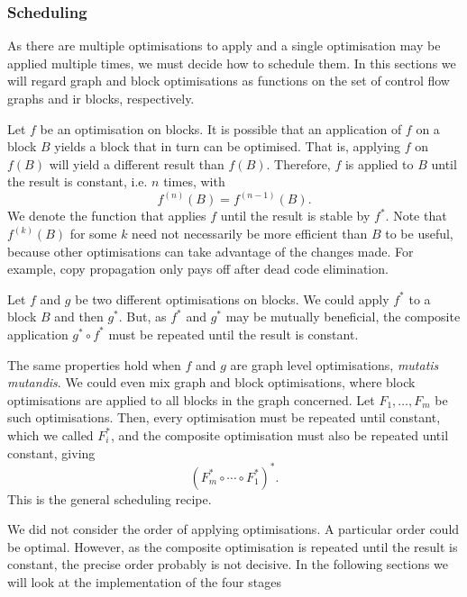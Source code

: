 \subsubsection*{Scheduling}
As there are multiple optimisations to apply and a single optimisation may be applied multiple times, we must decide how to schedule them. In this sections we will regard graph and block optimisations as functions on the set of control flow graphs and ir blocks, respectively.

Let $f$ be an optimisation on blocks. It is possible that an application of $f$ on a block $B$ yields a block that in turn can be optimised. That is, applying $f$ on $f(B)$ will yield a different result than $f(B)$. Therefore, $f$ is applied to $B$ until the result is constant, i.e. $n$ times, with $$f^{(n)}(B) = f^{(n-1)}(B).$$ We denote the function that applies $f$ until the result is stable by $f^*$. Note that $f^{(k)}(B)$ for some $k$ need not necessarily be more efficient than $B$ to be useful, because other optimisations can take advantage of the changes made. For example, copy propagation only pays off after dead code elimination.

Let $f$ and $g$ be two different optimisations on blocks. We could apply $f^*$ to a block $B$ and then $g^*$. But, as $f^*$ and $g^*$ may be mutually beneficial, the composite application $g^* \circ f^*$ must be repeated until the result is constant.

The same properties hold when $f$ and $g$ are graph level optimisations, \emph{mutatis mutandis}. We could even mix graph and block optimisations, where block optimisations are applied to all blocks in the graph concerned. Let $F_1, \ldots, F_m$ be such optimisations. Then, every optimisation must be repeated until constant, which we called $F_i^*$, and the composite optimisation must also be repeated until constant, giving $${(F_m^* \circ \cdots \circ F_1^*)}^*.$$ This is the general scheduling recipe.

We did not consider the order of applying optimisations. A particular order could be optimal. However, as the composite optimisation is repeated until the result is constant, the precise order probably is not decisive.
\newline
In the following sections we will look at the implementation of the four stages


